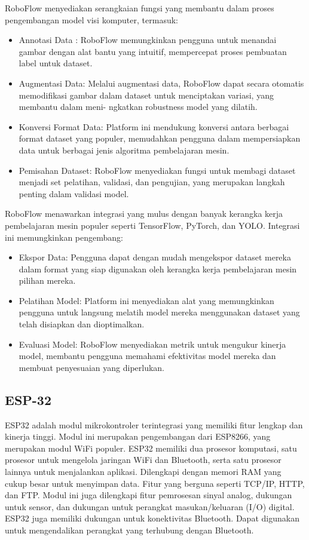 RoboFlow menyediakan serangkaian fungsi yang membantu dalam proses pengembangan model visi komputer, termasuk:
\begin{itemize}
    \item Annotasi Data : RoboFlow memungkinkan pengguna untuk menandai gambar dengan alat bantu yang intuitif, mempercepat proses pembuatan label untuk dataset.
    \item Augmentasi Data: Melalui augmentasi data, RoboFlow dapat secara otomatis memodifikasi gambar dalam dataset untuk menciptakan variasi, yang membantu dalam meni- ngkatkan robustness model yang dilatih.
    \item Konversi Format Data: Platform ini mendukung konversi antara berbagai format dataset yang populer, memudahkan pengguna dalam mempersiapkan data untuk berbagai jenis algoritma pembelajaran mesin.
    \item Pemisahan Dataset: RoboFlow menyediakan fungsi untuk membagi dataset menjadi set pelatihan, validasi, dan pengujian, yang merupakan langkah penting dalam validasi model.
\end{itemize}
RoboFlow menawarkan integrasi yang mulus dengan banyak kerangka kerja pembelajaran mesin populer seperti TensorFlow, PyTorch, dan YOLO. Integrasi ini memungkinkan pengembang:
\begin{itemize}
    \item Ekspor Data: Pengguna dapat dengan mudah mengekspor dataset mereka dalam format yang siap digunakan oleh kerangka kerja pembelajaran mesin pilihan mereka.
    \item Pelatihan Model: Platform ini menyediakan alat yang memungkinkan pengguna untuk langsung melatih model mereka menggunakan dataset yang telah disiapkan dan dioptimalkan.
    \item Evaluasi Model: RoboFlow menyediakan metrik untuk mengukur kinerja model, membantu pengguna memahami efektivitas model mereka dan membuat penyesuaian yang diperlukan.
\end{itemize}

\subsection{ESP-32}
ESP32 adalah modul mikrokontroler terintegrasi yang memiliki fitur lengkap dan kinerja tinggi. Modul ini merupakan pengembangan dari ESP8266, yang merupakan modul WiFi populer. ESP32 memiliki dua prosesor komputasi, satu prosesor untuk mengelola jaringan WiFi dan Bluetooth, serta satu prosesor lainnya untuk menjalankan aplikasi. Dilengkapi dengan memori RAM yang cukup besar untuk menyimpan data. Fitur yang berguna seperti TCP/IP, HTTP, dan FTP. Modul ini juga dilengkapi fitur pemrosesan sinyal analog, dukungan untuk sensor, dan dukungan untuk perangkat masukan/keluaran (I/O) digital. ESP32 juga memiliki dukungan untuk konektivitas Bluetooth. Dapat digunakan untuk mengendalikan perangkat yang terhubung dengan Bluetooth.